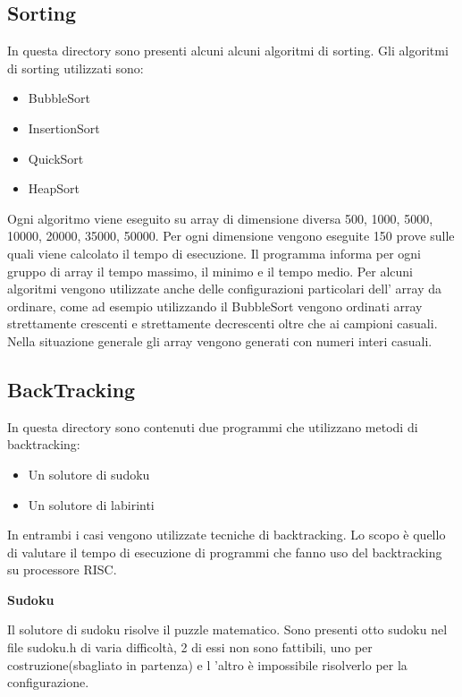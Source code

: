 \documentclass[12pt,a4paper]{report}
\begin{document}
\subsection{Sorting}
In questa directory sono presenti alcuni alcuni algoritmi di sorting. Gli algoritmi di sorting utilizzati sono:
\begin{itemize}
	\item BubbleSort
	\item InsertionSort
	\item QuickSort
	\item HeapSort
\end{itemize}

Ogni algoritmo viene eseguito su array di dimensione diversa 500, 1000, 5000, 10000, 20000, 35000, 50000. Per ogni dimensione vengono eseguite 150 prove sulle quali viene calcolato il tempo di esecuzione. Il programma informa per ogni gruppo di array il tempo massimo, il minimo e il tempo medio. Per alcuni algoritmi vengono utilizzate anche delle configurazioni particolari dell' array da ordinare, come ad esempio utilizzando il BubbleSort vengono ordinati array strettamente crescenti e strettamente decrescenti oltre che ai campioni casuali. Nella situazione generale gli array vengono generati con numeri interi casuali.

\subsection{BackTracking}
In questa directory sono contenuti due programmi che utilizzano metodi di backtracking:
\begin{itemize}
	\item Un solutore di sudoku
	\item Un solutore di labirinti
\end{itemize}

In entrambi i casi vengono utilizzate tecniche di backtracking.  Lo scopo è quello di valutare il tempo di esecuzione di programmi che fanno uso del backtracking su processore RISC.

\vspace{0.5cm}
\begin{large}
\textbf{Sudoku}
\end{large}

Il solutore di sudoku risolve il puzzle matematico.  Sono presenti otto sudoku nel file sudoku.h di varia difficoltà, 2 di essi non sono fattibili, uno per costruzione(sbagliato in partenza) e l 'altro è impossibile risolverlo per la configurazione.
\end{document}
